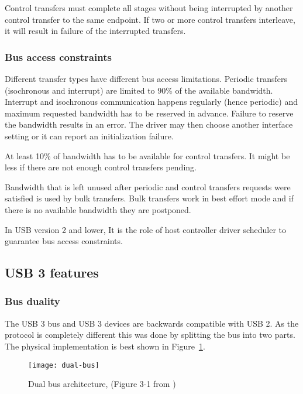 Control transfers must complete all stages without being interrupted by another
control transfer to the same endpoint. If two or more control transfers
interleave, it will result in failure of the interrupted transfers.

\subsubsection{Bus access constraints}

Different transfer types have different bus access limitations. Periodic
transfers (isochronous and interrupt) are limited to 90\% of the available
bandwidth. Interrupt and isochronous communication happens regularly (hence
periodic) and maximum requested bandwidth has to be reserved in advance.
Failure to reserve the bandwidth results in an error. The driver may then
choose another interface setting or it can report an initialization failure.

At least 10\% of bandwidth has to be available for control transfers. It might
be less if there are not enough control transfers pending.

Bandwidth that is left unused after periodic and control transfers requests
were satisfied is used by bulk transfers. Bulk transfers work in best effort
mode and if there is no available bandwidth they are postponed.

In USB version 2 and lower, It is the role of host controller driver scheduler
to guarantee bus access constraints.

\subsection{USB 3 features}

\subsubsection{Bus duality}

The USB 3 bus and USB 3 devices are backwards compatible with USB 2. As the
protocol is completely different this was done by splitting the bus into two
parts. The physical implementation is best shown in Figure~\ref{fig:dual-bus}.

\begin{figure}[h]
	\centering
	\texttt{[image: dual-bus]}
	\caption{Dual bus architecture, (Figure 3-1 from \cite{usb3})}
	\label{fig:dual-bus}
\end{figure}


